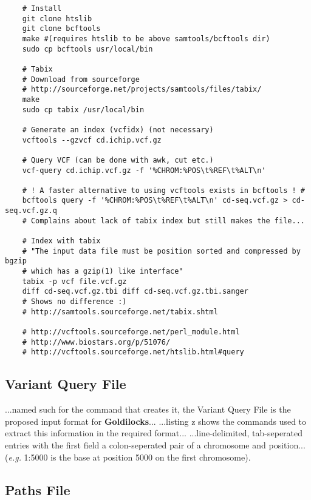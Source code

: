 \begin{verbatim}
    # Install
    git clone htslib
    git clone bcftools
    make #(requires htslib to be above samtools/bcftools dir)
    sudo cp bcftools usr/local/bin

    # Tabix
    # Download from sourceforge
    # http://sourceforge.net/projects/samtools/files/tabix/
    make
    sudo cp tabix /usr/local/bin

    # Generate an index (vcfidx) (not necessary)
    vcftools --gzvcf cd.ichip.vcf.gz

    # Query VCF (can be done with awk, cut etc.)
    vcf-query cd.ichip.vcf.gz -f '%CHROM:%POS\t%REF\t%ALT\n'

    # ! A faster alternative to using vcftools exists in bcftools ! #
    bcftools query -f '%CHROM:%POS\t%REF\t%ALT\n' cd-seq.vcf.gz > cd-seq.vcf.gz.q
    # Complains about lack of tabix index but still makes the file...

    # Index with tabix
    # "The input data file must be position sorted and compressed by bgzip 
    # which has a gzip(1) like interface"
    tabix -p vcf file.vcf.gz
    diff cd-seq.vcf.gz.tbi diff cd-seq.vcf.gz.tbi.sanger
    # Shows no difference :)
    # http://samtools.sourceforge.net/tabix.shtml

    # http://vcftools.sourceforge.net/perl_module.html
    # http://www.biostars.org/p/51076/
    # http://vcftools.sourceforge.net/htslib.html#query
\end{verbatim}

\subsection{Variant Query File}
\label{sec:vqf}

...named such for the command that creates it, the Variant Query File is the
proposed input format for \textbf{Goldilocks}...  ...listing z shows the
commands used to extract this information in the required format...
...line-delimited, tab-seperated entries with the first field a colon-seperated
pair of a chromosome and position... (\textit{e.g.} 1:5000 is the base at
position 5000 on the first chromosome).

\subsection{Paths File}
\label{sec:pathsfile}

